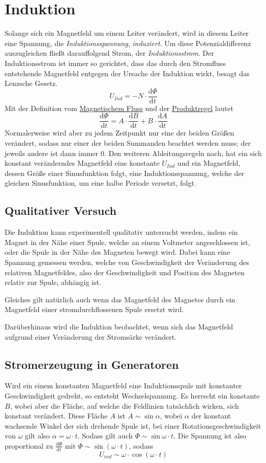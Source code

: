 \documentclass{article}
\begin{document}
 
\newcommand{\derive}[2]{\frac{\mathrm{d}#1}{\mathrm{d}#2}} 
 
\section{Induktion}  
Solange sich ein Magnetfeld um einem Leiter verändert, wird in diesem Leiter eine Spannung, die \emph{Induktionsspannung}, \emph{induziert}. \newline
Um diese Potenzialdifferenz auszugleichen fließt darauffolgend Strom, der \emph{Induktionsstrom}. Der Induktionsstrom ist immer so gerichtet, dass das  durch den Stromfluss entstehende Magnetfeld entgegen der Ursache der Induktion wirkt, besagt das Lenzsche Gesetz. 
\[
 U_{Ind} = -N \cdot \derive{\Phi}{t}
\] 
Mit der Definition vom \hyperref[Magnetischer Fluss]{Magnetischem Fluss} und der \hyperref[Ableitungsregeln]{Produktregel} lautet
\[
 \derive{\Phi}{t} = A \cdot \derive{B}{t} + B \cdot \derive{A}{t} 
\] 
Normalerweise wird aber zu jedem Zeitpunkt nur eine der beiden Größen verändert, sodass nur einer der beiden Summanden beachtet werden muss; der jeweils andere ist dann immer $0$.
Den weiteren Ableitungsregeln nach, hat ein sich konstant veränderndes Magnetfeld eine konstante $U_{Ind}$ und ein Magnetfeld, dessen Größe einer Sinusfunktion folgt, eine Induktionsspannung, welche der gleichen Sinusfunktion, um eine halbe Periode versetzt, folgt. 
 
\subsection{Qualitativer Versuch}
Die Induktion kann experimentell qualitativ untersucht werden, indem ein Magnet in der Nähe einer Spule, welche an einem Voltmeter angeschlossen ist, oder die Spule in der Nähe des Magneten bewegt wird. Dabei kann eine Spannung gemessen werden, welche von Geschwindigkeit der Veränderung des relativen Magnetfeldes, also der Geschwindigkeit und Position des Magneten relativ zur Spule, abhängig ist.
 
Gleiches gilt natürlich auch wenn das Magnetfeld des Magnetes durch ein Magnetfeld einer stromdurchflossenen Spule ersetzt wird.
 
Darüberhinaus wird die Induktion beobachtet, wenn sich das Magnetfeld aufgrund einer Veränderung der Stromsärke verändert.  
 
\subsection{Stromerzeugung in Generatoren}
Wird ein einem konstanten Magnetfeld eine Induktionsspule mit konstanter Geschwindigkeit gedreht, so entsteht Wechselspannung. Es herrscht ein konstante $B$, wobei aber die Fläche, auf welche die Feldlinien tatsächlich wirken, sich konstant verändert. Diese Fläche $A$ ist $A \sim \sin{\alpha}$, wobei $\alpha$ der konstant wachsende Winkel der sich drehende Spule ist, bei einer Rotationsgeschwindigkeit von $\omega$ gilt also $\alpha = \omega \cdot t$. Sodass gilt auch $\Phi \sim \sin{\omega \cdot t}$. Die Spannung ist also proportional zu $\displaystyle \derive{\Phi}{t}$ mit $\Phi \sim \sin{(\omega \cdot t)}$, sodass
\[
 U_{ind} \sim \omega \cdot \cos{(\omega \cdot t)}
\] 
 
\end{document}
